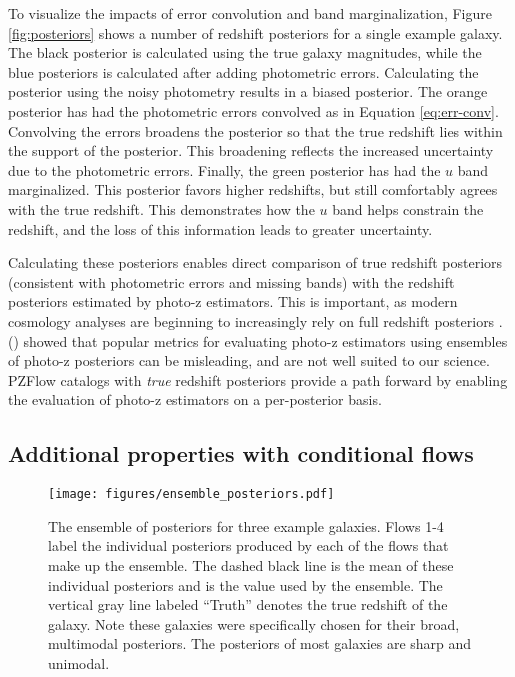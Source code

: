 \documentclass[twocolumn,twocolappendix,linenumbers]{aastex631}
\newcommand{\citePZt}{\citetalias{schmidt2020} (\citeyear{schmidt2020})\xspace}
\begin{document}
To visualize the impacts of error convolution and band marginalization, Figure \ref{fig:posteriors} shows a number of redshift posteriors for a single example galaxy.
The black posterior is calculated using the true galaxy magnitudes, while the blue posteriors is calculated after adding photometric errors.
Calculating the posterior using the noisy photometry results in a biased posterior.
The orange posterior has had the photometric errors convolved as in Equation \ref{eq:err-conv}.
Convolving the errors broadens the posterior so that the true redshift lies within the support of the posterior.
This broadening reflects the increased uncertainty due to the photometric errors.
Finally, the green posterior has had the $u$ band marginalized.
This posterior favors higher redshifts, but still comfortably agrees with the true redshift.
This demonstrates how the $u$ band helps constrain the redshift, and the loss of this information leads to greater uncertainty.

Calculating these posteriors enables direct comparison of true redshift posteriors (consistent with photometric errors and missing bands) with the redshift posteriors estimated by photo-z estimators.
This is important, as modern cosmology analyses are beginning to increasingly rely on full redshift posteriors \citep{mandelbaum2008,newman2022}.
\citePZt showed that popular metrics for evaluating photo-z estimators using ensembles of photo-z posteriors can be misleading, and are not well suited to our science.
PZFlow catalogs with \emph{true} redshift posteriors provide a path forward by enabling the evaluation of photo-z estimators on a per-posterior basis.


\subsection{Additional properties with conditional flows}
\label{sec:fwd-model-conditional}

\begin{figure*}[t]
    \begin{centering}
        \texttt{[image: figures/ensemble\_posteriors.pdf]}
        \caption{
            The ensemble of posteriors for three example galaxies.
            Flows 1-4 label the individual posteriors produced by each of the flows that make up the ensemble.
            The dashed black line is the mean of these individual posteriors and is the value used by the ensemble.
            The vertical gray line labeled ``Truth'' denotes the true redshift of the galaxy.
            Note these galaxies were specifically chosen for their broad, multimodal posteriors.
            The posteriors of most galaxies are sharp and unimodal.
        }
        \label{fig:ensemble-posteriors}
    \end{centering}
\end{figure*}
\end{document}
